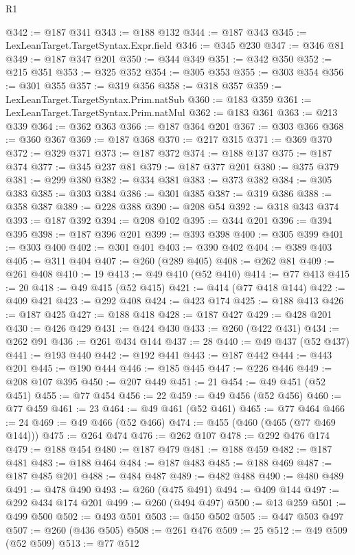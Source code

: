 \begin{lexlean}{R1}
\begin{coremodule}
@342 := @187 @341
@343 := @188 @132
@344 := @187 @343
@345 := LexLeanTarget.TargetSyntax.Expr.field
@346 := @345 @230
@347 := @346 @81
@349 := @187 @347 @201
@350 := @344 @349
@351 := @342 @350
@352 := @215 @351
@353 := @325 @352
@354 := @305 @353
@355 := @303 @354
@356 := @301 @355
@357 := @319 @356
@358 := @318 @357
@359 := LexLeanTarget.TargetSyntax.Prim.natSub
@360 := @183 @359
@361 := LexLeanTarget.TargetSyntax.Prim.natMul
@362 := @183 @361
@363 := @213 @339
@364 := @362 @363
@366 := @187 @364 @201
@367 := @303 @366
@368 := @360 @367
@369 := @187 @368
@370 := @217 @315
@371 := @369 @370
@372 := @329 @371
@373 := @187 @372
@374 := @188 @137
@375 := @187 @374
@377 := @345 @237 @81
@379 := @187 @377 @201
@380 := @375 @379
@381 := @299 @380
@382 := @334 @381
@383 := @373 @382
@384 := @305 @383
@385 := @303 @384
@386 := @301 @385
@387 := @319 @386
@388 := @358 @387
@389 := @228 @388
@390 := @208 @54
@392 := @318 @343 @374
@393 := @187 @392
@394 := @208 @102
@395 := @344 @201
@396 := @394 @395
@398 := @187 @396 @201
@399 := @393 @398
@400 := @305 @399
@401 := @303 @400
@402 := @301 @401
@403 := @390 @402
@404 := @389 @403
@405 := @311 @404
@407 := @260 (@289 @405)
@408 := @262 @81
@409 := @261 @408
@410 := 19
@413 := @49 @410 (@52 @410)
@414 := @77 @413
@415 := 20
@418 := @49 @415 (@52 @415)
@421 := @414 (@77 @418 @144)
@422 := @409 @421
@423 := @292 @408
@424 := @423 @174
@425 := @188 @413
@426 := @187 @425
@427 := @188 @418
@428 := @187 @427
@429 := @428 @201
@430 := @426 @429
@431 := @424 @430
@433 := @260 (@422 @431)
@434 := @262 @91
@436 := @261 @434 @144
@437 := 28
@440 := @49 @437 (@52 @437)
@441 := @193 @440
@442 := @192 @441
@443 := @187 @442
@444 := @443 @201
@445 := @190 @444
@446 := @185 @445
@447 := @226 @446
@449 := @208 @107 @395
@450 := @207 @449
@451 := 21
@454 := @49 @451 (@52 @451)
@455 := @77 @454
@456 := 22
@459 := @49 @456 (@52 @456)
@460 := @77 @459
@461 := 23
@464 := @49 @461 (@52 @461)
@465 := @77 @464
@466 := 24
@469 := @49 @466 (@52 @466)
@474 := @455 (@460 (@465 (@77 @469 @144)))
@475 := @264 @474
@476 := @262 @107
@478 := @292 @476 @174
@479 := @188 @454
@480 := @187 @479
@481 := @188 @459
@482 := @187 @481
@483 := @188 @464
@484 := @187 @483
@485 := @188 @469
@487 := @187 @485 @201
@488 := @484 @487
@489 := @482 @488
@490 := @480 @489
@491 := @478 @490
@493 := @260 (@475 @491)
@494 := @409 @144
@497 := @292 @434 @174 @201
@499 := @260 (@494 @497)
@500 := @13 @259
@501 := @499 @500
@502 := @493 @501
@503 := @450 @502
@505 := @447 @503 @497
@507 := @260 (@436 @505)
@508 := @261 @476
@509 := 25
@512 := @49 @509 (@52 @509)
@513 := @77 @512

\end{coremodule}
\end{lexlean}
